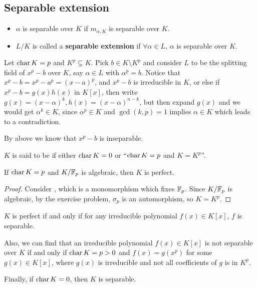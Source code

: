 \subsection{Separable extension}

\begin{definition} \hfill
  \begin{itemize}
    \item $\alpha$ is separable over $K$ if $m_{\alpha, K}$ is separable over $K$.
    \item $L/K$ is called a {\bf separable extension}
      if $\forall \alpha \in L$, $\alpha$ is separable over $K$.
  \end{itemize}
\end{definition}

\begin{example}
  Let $\operatorname{char} K = p$ and $K^p \subsetneq K$. Pick $b \in K \setminus K^p$ and consider $L$ to be
  the splitting field of $x^p - b$ over $K$, say $\alpha \in L$ with $\alpha^p = b$.
  Notice that $x^p - b = x^p - a^p = (x - a)^p$, and $x^p - b$ is irreducible in $K$, or else
  if $x^p - b = g(x) h(x)$ in $K[x]$, then write $g(x) = (x - \alpha)^k, h(x) = (x - \alpha)^{n-k}$,
  but then expand $g(x)$ and we would get $\alpha^k \in K$, since $\alpha^p \in K$ and
  $\gcd(k, p) = 1$ implies $\alpha \in K$ which leads to a contradiction.

  By above we know that $x^p - b$ is inseparable.
\end{example}

\begin{definition}
  $K$ is said to be \emph{} if either $\operatorname{char} K = 0$ or ``$\operatorname{char} K = p$ and $K = K^p$''.
\end{definition}

\begin{example}
  If $\operatorname{char} K = p$ and ${K}/{\mathbb{F}_p}$ is algebraic, then $K$ is perfect.

  \begin{proof}
    Consider , which is a monomorphism which fixes $\mathbb{F}_p$.
    Since ${K}/{\mathbb{F}_p}$ is algebraic, by the exercise problem, $\sigma_p$ is an automorphism, so $K = K^p$.
  \end{proof}
\end{example}

\begin{fact}
  $K$ is perfect if and only if for any irreducible polynomial $f(x) \in K[x]$, $f$ is separable.

  Also, we can find that an irreducible polynomial $f(x) \in K[x]$ is not separable over $K$
  if and only if $\operatorname{char} K = p > 0$ and $f(x) = g(x^p)$ for some $g(x) \in K[x]$, where
  $g(x)$ is irreducible and not all coefficients of $g$ is in $K^p$.

  Finally, if $\operatorname{char} K = 0$, then $K$ is separable.
\end{fact}

